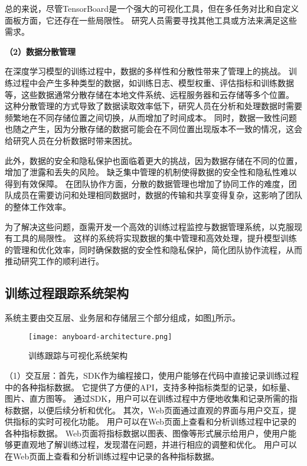 总的来说，尽管TensorBoard是一个强大的可视化工具，但在多任务对比和自定义面板方面，它还存在一些局限性。
研究人员需要寻找其他工具或方法来满足这些需求。

\textbf{（2）数据分散管理}

在深度学习模型的训练过程中，数据的多样性和分散性带来了管理上的挑战。
训练过程中会产生多种类型的数据，如训练日志、模型权重、评估指标和训练数据等，这些数据通常分散存储在本地文件系统、远程服务器和云存储等多个位置。
这种分散管理的方式导致了数据读取效率低下，研究人员在分析和处理数据时需要频繁地在不同存储位置之间切换，从而增加了时间成本。
同时，数据一致性问题也随之产生，因为分散存储的数据可能会在不同位置出现版本不一致的情况，这会给研究人员在分析数据时带来困扰。

此外，数据的安全和隐私保护也面临着更大的挑战，因为数据存储在不同的位置，增加了泄露和丢失的风险。
缺乏集中管理的机制使得数据的安全性和隐私性难以得到有效保障。
在团队协作方面，分散的数据管理也增加了协同工作的难度，团队成员在需要访问和处理相同数据时，数据的传输和共享变得复杂，这影响了团队的整体工作效率。

为了解决这些问题，亟需开发一个高效的训练过程监控与数据管理系统，以克服现有工具的局限性。
这样的系统将实现数据的集中管理和高效处理，提升模型训练的管理和优化效率，同时确保数据的安全性和隐私保护，简化团队协作流程，从而推动研究工作的顺利进行。

\subsection{训练过程跟踪系统架构}

系统主要由交互层、业务层和存储层三个部分组成，如图\ref{fig:anyboardarch}所示。

\begin{figure}
  \centering
  \texttt{[image: anyboard-architecture.png]}
  \caption{训练跟踪与可视化系统架构}
  \label{fig:anyboardarch}
\end{figure}

（1）交互层：首先，SDK作为编程接口，使用户能够在代码中直接记录训练过程中的各种指标数据。
它提供了方便的API，支持多种指标类型的记录，如标量、图片、直方图等。
通过SDK，用户可以在训练过程中方便地收集和记录所需的指标数据，以便后续分析和优化。
其次，Web页面通过直观的界面与用户交互，提供指标的实时可视化功能。
用户可以在Web页面上查看和分析训练过程中记录的各种指标数据。
Web页面将指标数据以图表、图像等形式展示给用户，使用户能够更直观地了解训练过程，发现潜在问题，并进行相应的调整和优化。
用户可以在Web页面上查看和分析训练过程中记录的各种指标数据。

